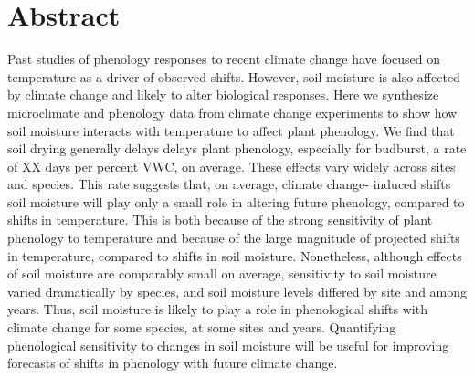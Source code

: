 \documentclass{article}
\begin{document}
\section*{Abstract}
Past studies of phenology responses to recent climate change have focused on temperature as a driver of observed shifts. However, soil moisture is also affected by climate change and likely to alter biological responses. Here we synthesize microclimate and phenology data from climate change experiments to show how soil moisture interacts with temperature to affect plant phenology. We find that soil drying generally delays delays plant phenology, especially for budburst, a rate of XX days per percent VWC, on average. These effects vary widely across sites and species. This rate suggests that, on average, climate change- induced shifts soil moisture will play only a small role in altering future phenology, compared to shifts in temperature. This is both because of the strong sensitivity of plant phenology to temperature and because of the large magnitude of projected shifts in temperature, compared to shifts in soil moisture. Nonetheless, although effects of soil moisture are comparably small on average, sensitivity to soil moisture varied dramatically by species, and soil moisture levels differed by site and among years. Thus, soil moisture is likely to play a role in phenological shifts with climate change for some species, at some sites and years. Quantifying phenological sensitivity to changes in soil moisture will be useful for improving forecasts of shifts in phenology with future climate change.  
\end{document}
